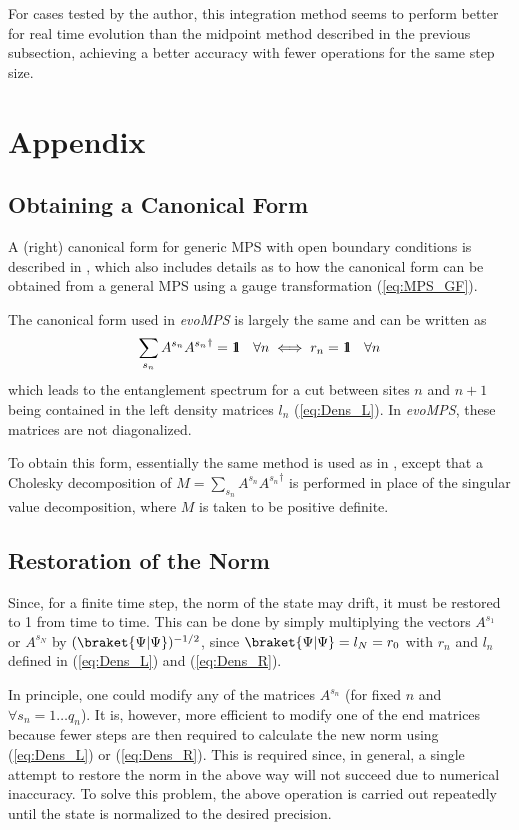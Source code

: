 \documentclass[a4paper,11pt]{article}
\newcommand{\id}{\mbox{$1 \hspace{-1.0mm} {\bf l}$}}
\begin{document}
For cases tested by the author, this integration method seems to perform better
for real time evolution than the midpoint method described in the previous subsection,
achieving a better accuracy with fewer operations for the same step size. 

\section{Appendix}

\subsection{Obtaining a Canonical Form}
A (right) canonical form for generic MPS with open boundary conditions is described in 
\cite{perez-garcia_matrix_2006}, which also includes details as to how the canonical
form can be obtained from a general MPS using a gauge transformation (\ref{eq:MPS_GF}). 

The canonical form used in \emph{evoMPS} is largely the same and can be written as
\begin{equation}
	\sum_{s_n} A^{s_n} {A^{s_n}}^\dagger = \id \quad \forall n \iff r_n = \id \quad \forall n
\end{equation}
which leads to the entanglement spectrum for a cut between sites $n$ and $n+1$ 
being contained in the left density matrices $l_n$ (\ref{eq:Dens_L}). In \emph{evoMPS}, 
these matrices are not diagonalized.

To obtain this form, essentially the same method is used as in \cite{perez-garcia_matrix_2006}, 
except that a Cholesky decomposition of
$M = \sum_{s_n} A^{s_n} {A^{s_n}}^\dagger$
is performed in place of the singular value decomposition, where $M$ is taken to be positive
definite. %


\subsection{Restoration of the Norm}
Since, for a finite time step, the norm of the state may drift, it must
be restored to 1 from time to time. This can be done by simply multiplying the vectors $A^{s_1}$ 
or $A^{s_N}$ by $(\braket{\Psi | \Psi})^{-1/2}$, since $\braket{\Psi | \Psi} = l_N = r_0$ with
$r_n$ and $l_n$ defined in (\ref{eq:Dens_L}) and (\ref{eq:Dens_R}).

In principle, one could modify any of the matrices $A^{s_n}$ (for fixed $n$ and $\forall s_n = 1 \dots q_n$). It is, however,
more efficient to modify one of the end matrices because fewer steps are then required to calculate
the new norm using (\ref{eq:Dens_L}) or (\ref{eq:Dens_R}). This is required since, in general, a single attempt to restore the norm in the above
way will not succeed due to numerical inaccuracy. To solve this problem, the above operation
is carried out repeatedly until the state is normalized to the desired precision.



\end{document}
